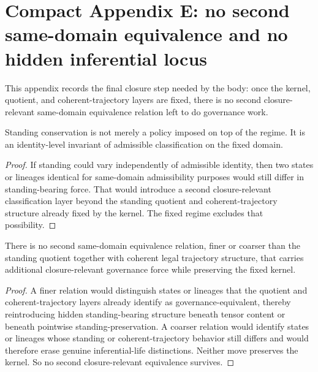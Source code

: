 \section{Compact Appendix E: no second same-domain equivalence and no hidden inferential locus}
\label{app:no-second-equivalence}

This appendix records the final closure step needed by the body: once the kernel, quotient, and coherent-trajectory layers are fixed, there is no second closure-relevant same-domain equivalence relation left to do governance work.

\begin{theorem}
Standing conservation is not merely a policy imposed on top of the regime. It is an identity-level invariant of admissible classification on the fixed domain.
\end{theorem}

\begin{proof}
If standing could vary independently of admissible identity, then two states or lineages identical for same-domain admissibility purposes would still differ in standing-bearing force. That would introduce a second closure-relevant classification layer beyond the standing quotient and coherent-trajectory structure already fixed by the kernel. The fixed regime excludes that possibility.
\end{proof}

\begin{theorem}
There is no second same-domain equivalence relation, finer or coarser than the standing quotient together with coherent legal trajectory structure, that carries additional closure-relevant governance force while preserving the fixed kernel.
\end{theorem}

\begin{proof}
A finer relation would distinguish states or lineages that the quotient and coherent-trajectory layers already identify as governance-equivalent, thereby reintroducing hidden standing-bearing structure beneath tensor content or beneath pointwise standing-preservation. A coarser relation would identify states or lineages whose standing or coherent-trajectory behavior still differs and would therefore erase genuine inferential-life distinctions. Neither move preserves the kernel. So no second closure-relevant equivalence survives.
\end{proof}

